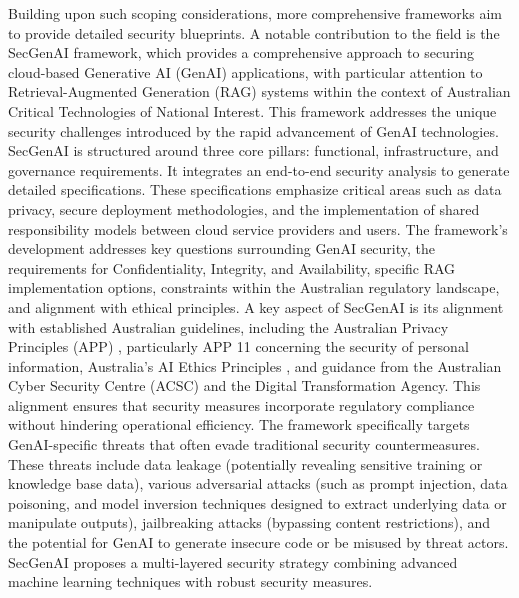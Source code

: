 Building upon such scoping considerations, more comprehensive frameworks aim to provide detailed security blueprints. A notable contribution to the field is the SecGenAI framework, which provides a comprehensive approach to securing cloud-based Generative AI (GenAI) applications, with particular attention to Retrieval-Augmented Generation (RAG) systems within the context of Australian Critical Technologies of National Interest\cite{haryanto_secgenai_2024}. This framework addresses the unique security challenges introduced by the rapid advancement of GenAI technologies\cite{haryanto_secgenai_2024}.
SecGenAI is structured around three core pillars: functional, infrastructure, and governance requirements\cite{haryanto_secgenai_2024}. It integrates an end-to-end security analysis to generate detailed specifications. These specifications emphasize critical areas such as data privacy, secure deployment methodologies, and the implementation of shared responsibility models between cloud service providers and users\cite{haryanto_secgenai_2024}. The framework's development addresses key questions surrounding GenAI security, the requirements for Confidentiality, Integrity, and Availability, specific RAG implementation options, constraints within the Australian regulatory landscape, and alignment with ethical principles\cite{haryanto_secgenai_2024}.
A key aspect of SecGenAI is its alignment with established Australian guidelines, including the Australian Privacy Principles (APP) \cite{resources_australias_2024}, particularly APP 11 concerning the security of personal information, Australia's AI Ethics Principles \cite{resources_australias_2024}, and guidance from the Australian Cyber Security Centre (ACSC) and the Digital Transformation Agency\cite{haryanto_secgenai_2024}. This alignment ensures that security measures incorporate regulatory compliance without hindering operational efficiency\cite{haryanto_secgenai_2024}. The framework specifically targets GenAI-specific threats that often evade traditional security countermeasures. These threats include data leakage (potentially revealing sensitive training or knowledge base data), various adversarial attacks (such as prompt injection, data poisoning, and model inversion techniques designed to extract underlying data or manipulate outputs), jailbreaking attacks (bypassing content restrictions), and the potential for GenAI to generate insecure code or be misused by threat actors\cite{haryanto_secgenai_2024}. SecGenAI proposes a multi-layered security strategy combining advanced machine learning techniques with robust security measures.

